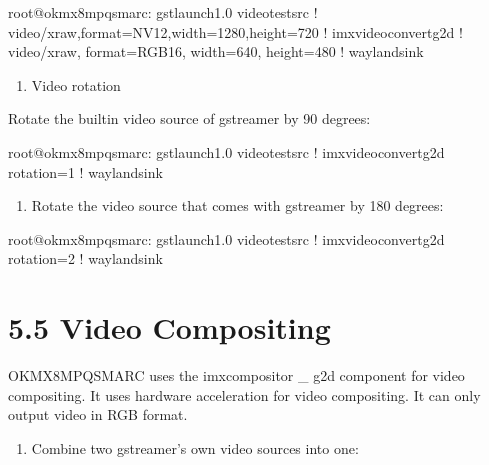 \documentclass[letterpaper,10pt,openany,english]{sphinxmanual}
\begin{document}
\begin{sphinxVerbatim}[commandchars=\\\{\}]
root@ok\PYGZhy{}mx8mpq\PYGZhy{}smarc:\PYGZti{}\PYGZsh{} gst\PYGZhy{}launch\PYGZhy{}1.0 videotestsrc ! video/x\PYGZhy{}raw,format=NV12,width=1280,height=720 ! imxvideoconvert\PYGZus{}g2d ! video/x\PYGZhy{}raw, format=RGB16, width=640, height=480 ! waylandsink
\end{sphinxVerbatim}
\begin{enumerate}
%
\setcounter{enumi}{3}
\item {} 
\sphinxAtStartPar
Video rotation

\end{enumerate}

\sphinxAtStartPar
Rotate the built\sphinxhyphen{}in video source of gstreamer by 90 degrees:

\begin{sphinxVerbatim}[commandchars=\\\{\}]
root@ok\PYGZhy{}mx8mpq\PYGZhy{}smarc:\PYGZti{}\PYGZsh{} gst\PYGZhy{}launch\PYGZhy{}1.0 videotestsrc ! imxvideoconvert\PYGZus{}g2d rotation=1 ! waylandsink
\end{sphinxVerbatim}
\begin{enumerate}
%
\setcounter{enumi}{4}
\item {} 
\sphinxAtStartPar
Rotate the video source that comes with gstreamer by 180 degrees:

\end{enumerate}

\begin{sphinxVerbatim}[commandchars=\\\{\}]
root@ok\PYGZhy{}mx8mpq\PYGZhy{}smarc:\PYGZti{}\PYGZsh{} gst\PYGZhy{}launch\PYGZhy{}1.0 videotestsrc ! imxvideoconvert\PYGZus{}g2d rotation=2 ! waylandsink
\end{sphinxVerbatim}


\section{5.5 Video Compositing}
\label{\detokenize{linux-manual:video-compositing}}
\sphinxAtStartPar
OK\sphinxhyphen{}MX8MPQ\sphinxhyphen{}SMARC uses the imxcompositor \_ g2d component for video compositing. It uses hardware acceleration for video compositing. It can only output video in RGB format.
\begin{enumerate}
%
\item {} 
\sphinxAtStartPar
Combine two gstreamer’s own video sources into one:

\end{enumerate}
\end{document}
